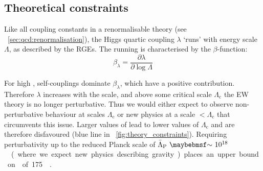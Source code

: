 


\subsection{Theoretical constraints}
\label{sec:prior_constraints:theory}

Like all coupling constants in a renormalisable theory (see 
\Section~\ref{sec:qcd:renormalisation}), the Higgs quartic coupling $\lambda$ `runs' with 
energy scale $\Lambda$, as described by the \acp{RGE}. The running is characterised by 
the $\beta$-function:
\begin{equation*}
	\beta_{\lambda} = \frac{\partial \lambda}{\partial \log\Lambda}
\end{equation*}

For high \mH, self-couplings dominate $\beta_{\lambda}$, which have a
positive contribution. Therefore $\lambda$ increases with the scale, and above some 
critical scale $\Lambda_{\text{c}}$ the \ac{EW} theory is no longer perturbative. Thus we 
would either expect to observe non-perturbative behaviour at scales 
\about$\Lambda_{\text{c}}$ or new physics at a scale $<\Lambda_{\text{c}}$ that 
circumvents this issue. Larger values of \mH lead to lower values of $\Lambda_{\text{c}}$ 
and are therefore disfavoured (blue line in \Figure~\ref{fig:theory_constraints}). 
Requiring perturbativity up to the reduced Planck scale of 
\unit{$\bar{\Lambda}_{\text{P}}~\about~10^{18}$}{\GeV} (where we expect new physics 
describing gravity) places an upper bound on \mH of \unit{175}{\GeV} \cite{Ellis:2009}.

